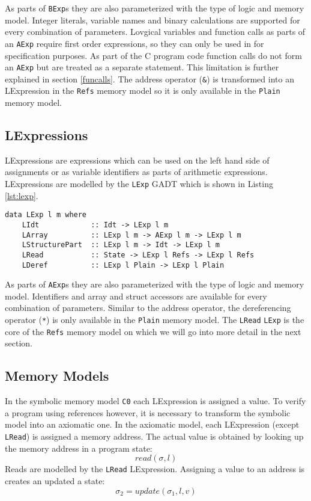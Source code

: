 \documentclass[12pt]{article}
\begin{document}
As parts of \texttt{BExp}s they are also parameterized with the type of logic and memory model.
Integer literals, variable names and binary calculations are supported for every combination of parameters.
Lovgical variables and function calls as parts of an \texttt{AExp} require first order expressions, so they can only be used in for specification purposes. 
As part of the C program code function calls do not form an \texttt{AExp} but are treated as a separate statement.
This limitation is further explained in section \ref{funcalls}.
The address operator (\texttt{\&}) is transformed into an LExpression in the \texttt{Refs} memory model so it is only available in the \texttt{Plain} memory model.

\subsection{LExpressions}
LExpressions are expressions which can be used on the left hand side of assignments or as variable identifiers as parts of arithmetic expressions. LExpressions are modelled by the \texttt{LExp} GADT which is shown in Listing \ref{lst:lexp}.

\begin{lstlisting}[style=c0, caption=LExp, label=lst:lexp]
data LExp l m where
    LIdt            :: Idt -> LExp l m
    LArray          :: LExp l m -> AExp l m -> LExp l m
    LStructurePart  :: LExp l m -> Idt -> LExp l m
    LRead           :: State -> LExp l Refs -> LExp l Refs
    LDeref          :: LExp l Plain -> LExp l Plain
\end{lstlisting}

As parts of \texttt{AExp}s they are also parameterized with the type of logic and memory model.
Identifiers and array and struct accessors are available for every combination of parameters.
Similar to the address operator, the dereferencing operator (\texttt{*}) is only available in the \texttt{Plain} memory model.
The \texttt{LRead} \texttt{LExp} is the core of the \texttt{Refs} memory model on which we will go into more detail in the next section.


\subsection{Memory Models}
In the symbolic memory model \texttt{C0} each LExpression is assigned a value.
To verify a program using references however, it is necessary to transform the symbolic model into an axiomatic one.
In the axiomatic model, each LExpression (except \texttt{LRead}) is assigned a memory address.
The actual value is obtained by looking up the memory address in a program state:
\[ read(\sigma, l) \]
Reads are modelled by the \texttt{LRead} LExpression.
Assigning a value to an address is creates an updated a state:
\[ \sigma_2 = update(\sigma_1, l, v) \]
\end{document}
